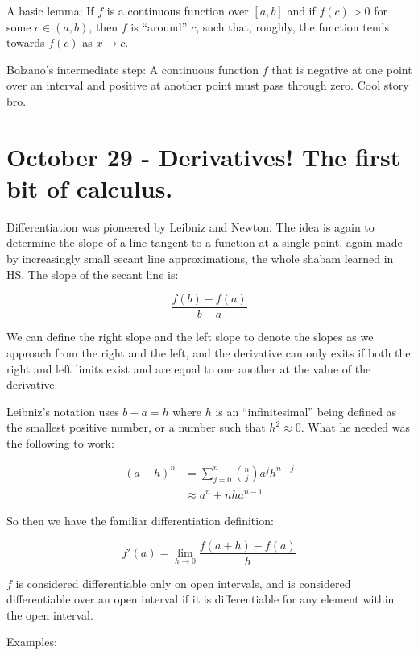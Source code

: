 \documentclass{report}
\begin{document}
A basic lemma: If $f$ is a continuous function over $[a,b]$ and if $f(c) > 0$ for some $c \in (a,b)$, then $f$ is ``around'' $c$, such that, roughly, the function tends towards $f(c)$ as $x \to c$. 

Bolzano's intermediate step: A continuous function $f$ that is negative at one point over an interval and positive at another point must pass through zero. Cool story bro.

\chapter{October 29 - Derivatives! The first bit of calculus.}

Differentiation was pioneered by Leibniz and Newton. The idea is again to determine the slope of a line tangent to a function at a single point, again made by increasingly small secant line approximations, the whole shabam learned in HS. The slope of the secant line is:

$$\frac{f(b) - f(a)}{b-a}$$

We can define the right slope and the left slope to denote the slopes as we approach from the right and the left, and the derivative can only exits if both the right and left limits exist and are equal to one another at the value of the derivative. 

Leibniz's notation uses $b-a = h$ where $h$ is an ``infinitesimal'' being defined as the smallest positive number, or a number such that $h^2 \approx 0$. What he needed was the following to work:

\begin{align*}
(a+h)^n &= \displaystyle\sum\limits_{j=0}^n{{n \choose j} a^jh^{n-j}}\\
&\approx a^n + nha^{n-1}
\end{align*}

So then we have the familiar differentiation definition:

$$f'(a) = \displaystyle\lim\limits_{h \to 0} \frac{f(a + h) - f(a)}{h}$$

$f$ is considered differentiable only on open intervals, and is considered differentiable over an open interval if it is differentiable for any element within the open interval. 

Examples:
\end{document}
